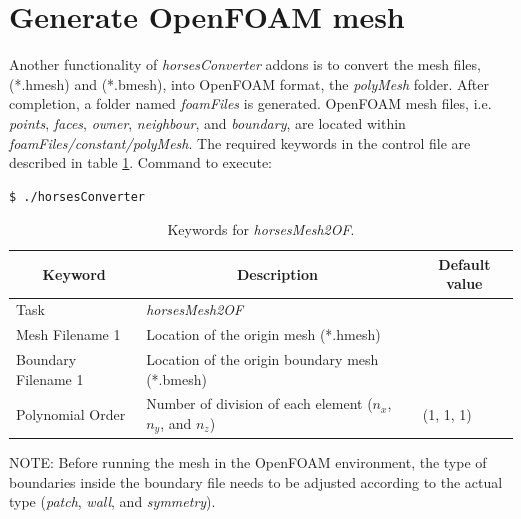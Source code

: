 \documentclass[a4paper,10pt]{report}
\begin{document}
\section{Generate OpenFOAM mesh} \label{tab:horsesMesh2OF}
Another functionality of \textit{horsesConverter} addons is to convert the mesh files, (*.hmesh) and (*.bmesh), into OpenFOAM format, the \textit{polyMesh} folder. After completion, a folder named \emph{foamFiles} is generated. OpenFOAM mesh files, i.e. \textit{points}, \textit{faces}, \textit{owner}, \textit{neighbour}, and \textit{boundary}, are located within \emph{foamFiles/constant/polyMesh}. The required keywords in the control file are described in table \ref{tab:horsesMesh2of}. Command to execute:

\begin{lstlisting}[language=bash]
	$ ./horsesConverter
\end{lstlisting}

\begin{longtable}{|p{4cm}|p{10cm}|p{2.2cm}|}
\caption{Keywords for \textit{horsesMesh2OF}.} \label{tab:horsesMesh2of} \\
\hline
\multicolumn{1}{|c|}{\textbf{Keyword}} & \multicolumn{1}{c|}{\textbf{Description}} & \multicolumn{1}{c|}{\textbf{Default value}} \\ \hline
\endfirsthead

Task 	        		& \textit{horsesMesh2OF} 						&  \\ \hline
Mesh Filename 1 		& Location of the origin mesh (*.hmesh) 	&  \\ \hline
Boundary Filename 1 	& Location of the origin boundary mesh (*.bmesh) 	&  \\ \hline
Polynomial Order 	& Number of division of each element ($n_x$, $n_y$, and $n_z$) 	& (1, 1, 1) \\ \hline
\end{longtable}

NOTE: Before running the mesh in the OpenFOAM environment, the type of boundaries inside the boundary file needs to be adjusted according to the actual type (\textit{patch}, \textit{wall}, and \textit{symmetry}).
\end{document}
